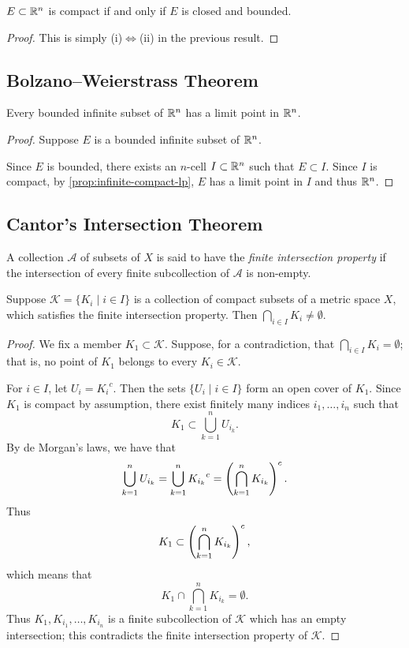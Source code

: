 \begin{theorem}\label{thrm:heine-borel}
$E\subset\mathbb R^n$ is compact if and only if $E$ is closed and bounded.
\end{theorem}

\begin{proof}
This is simply (i)$\iff$(ii) in the previous result.
\end{proof}

\subsection{Bolzano--Weierstrass Theorem}
\begin{theorem}\label{thrm:bolzano-weierstrass}
Every bounded infinite subset of $\mathbb R^n$ has a limit point in $\mathbb R^n$.
\end{theorem}

\begin{proof}
Suppose $E$ is a bounded infinite subset of $\mathbb R^n$.

Since $E$ is bounded, there exists an $n$-cell $I\subset\mathbb R^n$ such that $E\subset I$. Since $I$ is compact, by \ref{prop:infinite-compact-lp}, $E$ has a limit point in $I$ and thus $\mathbb R^n$. 
\end{proof}
\pagebreak

\subsection{Cantor's Intersection Theorem}
A collection $\mathcal{A}$ of subsets of $X$ is said to have the \emph{finite intersection property} if the intersection of every finite subcollection of $\mathcal{A}$ is non-empty.

\begin{proposition}\label{prop:finite-intersection-property}
Suppose $\mathcal{K}=\{K_i\mid i\in I\}$ is a collection of compact subsets of a metric space $X$, which satisfies the finite intersection property. Then $\bigcap_{i\in I}K_i\neq\emptyset$.
\end{proposition}

\begin{proof}
We fix a member $K_1\subset\mathcal{K}$. Suppose, for a contradiction, that $\bigcap_{i\in I}K_i=\emptyset$; that is, no point of $K_1$ belongs to every $K_i\in\mathcal{K}$. 

For $i\in I$, let $U_i={K_i}^c$. Then the sets $\{U_i\mid i\in I\}$ form an open cover of $K_1$. Since $K_1$ is compact by assumption, there exist finitely many indices $i_1,\dots,i_n$ such that
\[K_1\subset\bigcup_{k=1}^{n}U_{i_k}.\]
By de Morgan's laws, we have that
\[\bigcup_{k=1}^{n}U_{i_k}=\bigcup_{k=1}^{n}{K_{i_k}}^c=\left(\bigcap_{k=1}^{n}K_{i_k}\right)^c.\]
Thus
\[K_1\subset\left(\bigcap_{k=1}^{n}K_{i_k}\right)^c,\]
which means that
\[K_1\cap\bigcap_{k=1}^{n}K_{i_k}=\emptyset.\]
Thus $K_1,K_{i_1},\dots,K_{i_n}$ is a finite subcollection of $\mathcal{K}$ which has an empty intersection; this contradicts the finite intersection property of $\mathcal{K}$.
\end{proof}

